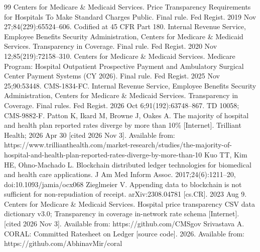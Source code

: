 \documentclass{IOS-Book-Article}
\begin{document}
\begin{thebibliography}{99}
\footnotesize\setlength{\itemsep}{0pt}
 Centers for Medicare \& Medicaid Services. Price Transparency Requirements for Hospitals To Make Standard Charges Public. Final rule. Fed Regist. 2019 Nov 27;84(229):65524--606. Codified at 45 CFR Part 180.
 Internal Revenue Service, Employee Benefits Security Administration, Centers for Medicare \& Medicaid Services. Transparency in Coverage. Final rule. Fed Regist. 2020 Nov 12;85(219):72158--310.
 Centers for Medicare \& Medicaid Services. Medicare Program: Hospital Outpatient Prospective Payment and Ambulatory Surgical Center Payment Systems (CY 2026). Final rule. Fed Regist. 2025 Nov 25;90:53448. CMS-1834-FC.
 Internal Revenue Service, Employee Benefits Security Administration, Centers for Medicare \& Medicaid Services. Transparency in Coverage. Final rules. Fed Regist. 2026 Oct 6;91(192):63748--867. TD 10058; CMS-9882-F.
 Patton K, Ikard M, Browne J, Oakes A. The majority of hospital and health plan reported rates diverge by more than 10\% [Internet]. Trilliant Health; 2026 Apr 30 [cited 2026 Nov 3]. Available from: https://www.trillianthealth.com/market-research/studies/the-majority-of-hospital-and-health-plan-reported-rates-diverge-by-more-than-10
 Kuo TT, Kim HE, Ohno-Machado L. Blockchain distributed ledger technologies for biomedical and health care applications. J Am Med Inform Assoc. 2017;24(6):1211--20, doi:10.1093/jamia/ocx068
 Zieglmeier V. Appending data to blockchain is not sufficient for non-repudiation of receipt. arXiv:2308.04781 [cs.CR]. 2023 Aug 9.
 Centers for Medicare \& Medicaid Services. Hospital price transparency CSV data dictionary v3.0; Transparency in coverage in-network rate schema [Internet]. [cited 2026 Nov 3]. Available from: https://github.com/CMSgov
 Srivastava A. CORAL: Committed Ratesheet on Ledger [source code]. 2026. Available from: https://github.com/AbhinavMir/coral
\end{thebibliography}
\end{document}
